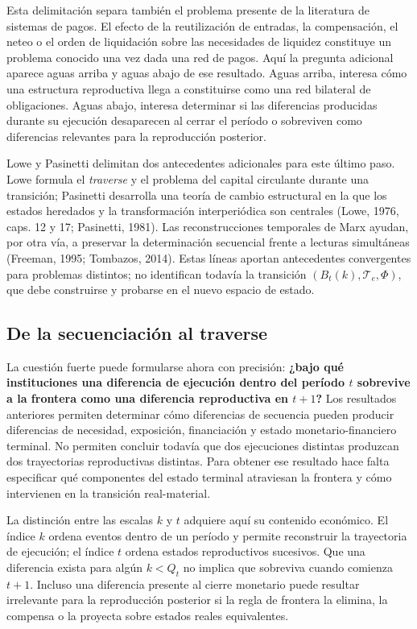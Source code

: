 \documentclass[10pt,a5paper,twoside]{article}
\begin{document}
Esta delimitación separa también el problema presente de la literatura de
sistemas de pagos. El efecto de la reutilización de entradas, la compensación,
el neteo o el orden de liquidación sobre las necesidades de liquidez constituye
un problema conocido una vez dada una red de pagos. Aquí la pregunta adicional
aparece aguas arriba y aguas abajo de ese resultado. Aguas arriba, interesa cómo
una estructura reproductiva llega a constituirse como una red bilateral de
obligaciones. Aguas abajo, interesa determinar si las diferencias producidas
durante su ejecución desaparecen al cerrar el período o sobreviven como
diferencias relevantes para la reproducción posterior.

Lowe y Pasinetti delimitan dos antecedentes adicionales para este último paso.
Lowe formula el \emph{traverse} y el problema del capital circulante durante una
transición; Pasinetti desarrolla una teoría de cambio estructural en la que los
estados heredados y la transformación interperiódica son centrales (Lowe, 1976,
caps. 12 y 17; Pasinetti, 1981). Las reconstrucciones temporales de Marx ayudan,
por otra vía, a preservar la determinación secuencial frente a lecturas
simultáneas (Freeman, 1995; Tombazos, 2014). Estas líneas aportan antecedentes
convergentes para problemas distintos; no identifican todavía la transición
\((B_t(k),\mathcal T_e,\Phi)\), que debe construirse y probarse en el nuevo
espacio de estado.

\subsection{De la secuenciación al traverse}\label{de-la-secuenciacion-al-traverse}

La cuestión fuerte puede formularse ahora con precisión: \textbf{¿bajo qué
instituciones una diferencia de ejecución dentro del período \(t\) sobrevive a
la frontera como una diferencia reproductiva en \(t+1\)?} Los resultados
anteriores permiten determinar cómo diferencias de secuencia pueden producir
diferencias de necesidad, exposición, financiación y estado
monetario-financiero terminal. No permiten concluir todavía que dos ejecuciones
distintas produzcan dos trayectorias reproductivas distintas. Para obtener ese
resultado hace falta especificar qué componentes del estado terminal atraviesan
la frontera y cómo intervienen en la transición real-material.

La distinción entre las escalas \(k\) y \(t\) adquiere aquí su contenido
económico. El índice \(k\) ordena eventos dentro de un período y permite
reconstruir la trayectoria de ejecución; el índice \(t\) ordena estados
reproductivos sucesivos. Que una diferencia exista para algún \(k<Q_t\) no
implica que sobreviva cuando comienza \(t+1\). Incluso una diferencia presente
al cierre monetario puede resultar irrelevante para la reproducción posterior
si la regla de frontera la elimina, la compensa o la proyecta sobre estados
reales equivalentes.
\end{document}
